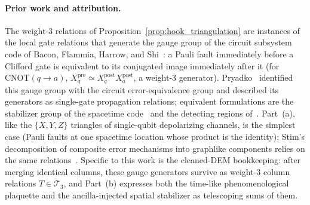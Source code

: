 \documentclass[12pt]{article}
\theoremstyle{definition}
\newcommand{\Tc}{\mathcal{T}_3}
\begin{document}
\paragraph{Prior work and attribution.}
The weight-3 relations of Proposition~\ref{prop:hook_triangulation} are instances of the local gate relations that
generate the gauge group of the circuit subsystem code of Bacon, Flammia, Harrow, and
Shi~\cite{BaconFlammiaHarrowShi2017}: a Pauli fault immediately before a Clifford gate is equivalent to its
conjugated image immediately after it (for $\mathrm{CNOT}(q \to a)$, $X_q^{\mathrm{pre}} \simeq
X_q^{\mathrm{post}} X_a^{\mathrm{post}}$, a weight-3 generator). Pryadko~\cite{Pryadko2020MLD} identified this
gauge group with the circuit error-equivalence group and described its generators as single-gate propagation
relations; equivalent formulations are the stabilizer group of the spacetime code~\cite{DelfossePaetznick2023} and
the detecting regions of~\cite{McEwenBaconGidney2023}. Part~(a), like the $\{X, Y, Z\}$ triangles of single-qubit
depolarizing channels, is the simplest case (Pauli faults at one spacetime location whose product is the identity);
Stim's decomposition of composite error mechanisms into graphlike components relies on the same
relations~\cite{Gidney2021Stim,StimDocs}. Specific to this work is the cleaned-DEM bookkeeping: after merging
identical columns, these gauge generators survive as weight-3 column relations $T \in \Tc$, and Part~(b) expresses
both the time-like phenomenological plaquette and the ancilla-injected spatial stabilizer as telescoping sums of
them.
\end{document}
